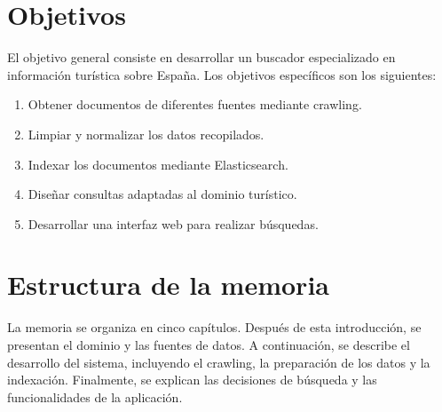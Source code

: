 \section{Objetivos} 
El objetivo general consiste en desarrollar un buscador especializado en información
turística sobre España. Los objetivos específicos son los siguientes: 
\begin{enumerate} 
\item Obtener documentos de diferentes fuentes mediante crawling. 
\item Limpiar y normalizar los datos recopilados. 
\item Indexar los documentos mediante Elasticsearch. 
\item Diseñar consultas adaptadas al dominio turístico. 
\item Desarrollar una interfaz web para realizar búsquedas. 
\end{enumerate} 
\section{Estructura de la memoria} 
La memoria se organiza en cinco capítulos. Después de esta introducción, se presentan
el dominio y las fuentes de datos. A continuación, se describe el desarrollo del sistema,
incluyendo el crawling, la preparación de los datos y la indexación. Finalmente, se explican
las decisiones de búsqueda y las funcionalidades de la aplicación.